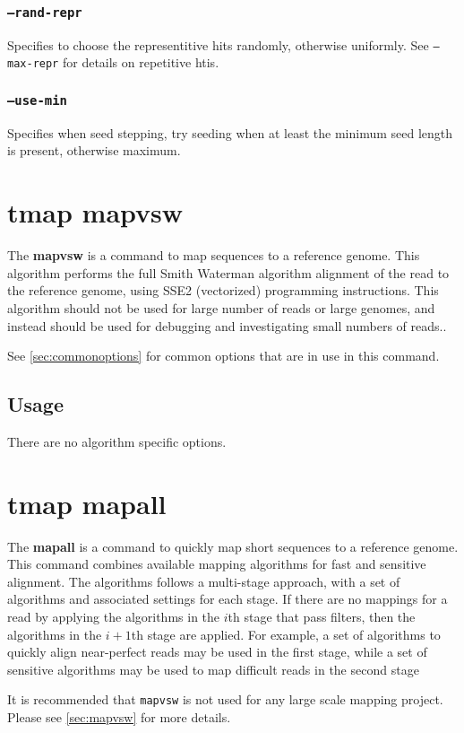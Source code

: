 \documentclass[a4paper,12pt]{book}
\newcommand{\TT}[1]{{\tt #1}} %
\newcommand{\BF}[1]{{\bf #1}} %
\begin{document}
\subsubsection{\TT{--rand-repr}}
Specifies to choose the representitive hits randomly, otherwise uniformly.
See \TT{--max-repr} for details on repetitive htis.

\subsubsection{\TT{--use-min}}
Specifies when seed stepping, try seeding when at least the minimum seed length is present, otherwise maximum.

\section{tmap mapvsw}
\label{sec:mapvsw}
The \BF{mapvsw} is a command to map sequences to a reference genome.
This algorithm performs the full Smith Waterman algorithm alignment of the read to the reference genome, using SSE2 (vectorized) programming instructions.
This algorithm should not be used for large number of reads or large genomes, and instead should be used for debugging and investigating small numbers of reads..

See \autoref{sec:commonoptions} for common options that are in use in this command.

\subsection{Usage}
There are no algorithm specific options.

\section{tmap mapall}
\label{sec:mapall}
The \BF{mapall} is a command to quickly map short sequences to a reference genome.
This command combines available mapping algorithms for fast and sensitive alignment.
The algorithms follows a multi-stage approach, with a set of algorithms and associated settings for each stage.
If there are no mappings for a read by applying the algorithms in the $i$th stage that pass filters, then the algorithms in the $i+1$th stage are applied. 
For example, a set of algorithms to quickly align near-perfect reads may be used in the first stage, while a set of sensitive algorithms may be used to map difficult reads in the second stage

It is recommended that \TT{mapvsw} is not used for any large scale mapping project.  
Please see \autoref{sec:mapvsw} for more details.
\end{document}

